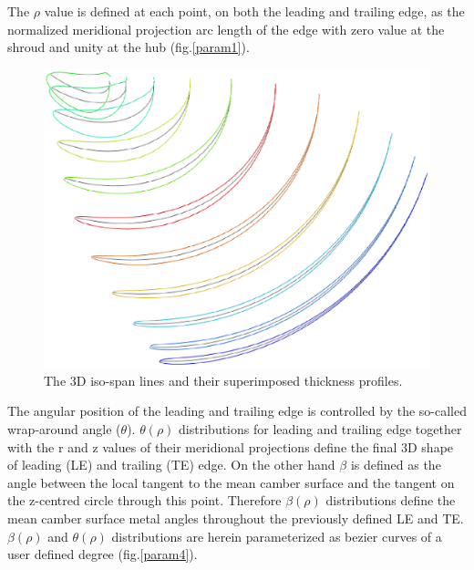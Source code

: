 
The $\rho$ value is defined at each point, on both the leading and trailing edge, as the normalized meridional projection arc length of the edge with zero value at the shroud and unity at the hub (fig.\ref{param1}). 

\begin{figure}[h!]
\centering
\includegraphics[width=120mm]{param3.eps} 
\caption{The 3D iso-span lines and their superimposed thickness profiles.}
\label{param3}
\end{figure}

The angular position of the leading and trailing edge is controlled by the so-called wrap-around angle ($\theta$). %
$\theta(\rho)$ distributions for leading and trailing edge together with the r and z values of their meridional projections define the final 3D shape of leading (LE) and trailing (TE) edge. On the other hand $\beta$ is defined as the angle between the local tangent to the mean camber surface and the tangent on the z-centred circle through this point. Therefore $\beta(\rho)$ distributions define the mean camber surface metal angles throughout the previously defined LE and TE. $\beta(\rho)$ and $\theta(\rho)$ distributions are herein parameterized as bezier curves of a user defined degree (fig.\ref{param4}).  


